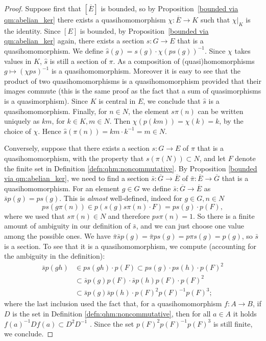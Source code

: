\documentclass[svgnames]{amsart}
\theoremstyle{plain}
\theoremstyle{definition}
\begin{document}
\begin{proof}
    Suppose first that $[\overline{E}]$ is bounded, so by Proposition~\ref{bounded via qm:abelian_ker} there exists a quasihomomorphism $\chi \colon \overline{E} \to K$ such that $\chi|_K$ is the identity. Since $[E]$ is bounded, by Proposition~\ref{bounded via qm:abelian_ker} again, there exists a section $s \colon G \to E$ that is a quasihomomorphism. We define $\hat{s}(g) = s(g) \cdot \chi(ps(g))^{-1}$.
    Since $\chi$ takes values in $K$, $\hat{s}$ is still a section of $\pi$. As a composition of (quasi)homomorphisms $g \mapsto (\chi p s)^{-1}$ is a quasihomomorphism. Moreover it is easy to see that the product of two quasihomomorphisms is a quasihomomorphism provided that their images commute (this is the same proof as the fact that a sum of quasimorphisms is a quasimorphism). Since $K$ is central in $E$, we conclude that $\hat{s}$ is a quasihomomorphism. Finally, for $n \in N$, the element $s\pi(n)$ can be written uniquely as $k m$, for $k \in K, m \in N$. Then $\chi(p(km)) = \chi(k) = k$, by the choice of $\chi$. Hence $\hat{s}(\pi(n)) = km \cdot k^{-1} = m \in N$.

    Conversely, suppose that there exists a section $s \colon G \to E$ of $\pi$ that is a quasihomomorphism, with the property that $s (\pi (N)) \subset N$, and let $F$ denote the finite set in Definition \ref{defn:qhm:noncommutative}. By Proposition \ref{bounded via qm:abelian_ker}, we need to find a section $\bar{s} \colon \overline{G} \to \overline{E}$ of $\bar{\pi} \colon \overline{E} \to \overline{G}$ that is a quasihomomorphism. For an element $g \in G$ we define $\bar{s} \colon \overline{G} \to \overline{E}$ as $\bar{s} p (g) = p s (g)$. This is \emph{almost} well-defined, indeed for $g \in G, n \in N$
    \[ps(g  \pi(n)) \in p(s(g) s\pi(n) \cdot F) = ps(g) \cdot p(F),\]
    where we used that $s\pi(n)\in N$ and therefore $ps\pi (n)=1$. So there is a finite amount of ambiguity in our definition of $\bar{s}$, and we can just choose one value among the possible ones. We have $\bar{\pi} \bar{s} p(g) = \bar{\pi} p s(g) = p \pi s(g) = p(g)$, so $\bar{s}$ is a section. To see that it is a quasihomomorphism, we compute (accounting for the ambiguity in the definition):
    \begin{align*}
        \bar{s}p(gh) &\in ps(gh) \cdot p(F) \subset p s(g) \cdot ps(h) \cdot p(F)^2 \\
        &\subset \bar{s} p(g) p(F) \cdot \bar{s}p(h) p(F) \cdot p(F)^2 \\
        &\subset \bar{s}p(g) \bar{s}p(h) \cdot p(F)^2 p(F)^{-1} p(F)^3;
    \end{align*}
    where the last inclusion used the fact that, for a quasihomomorphism $f \colon A \to B$, if $D$ is the set in Definition \ref{defn:qhm:noncommutative}, then for all $a \in A$ it holds $f(a)^{-1} D f(a) \subset D^2 D^{-1}$ \cite[Section 2.3]{fujikapo}. Since the set $p(F)^2 p(F)^{-1} p(F)^3$ is still finite, we conclude.
\end{proof}
\end{document}
